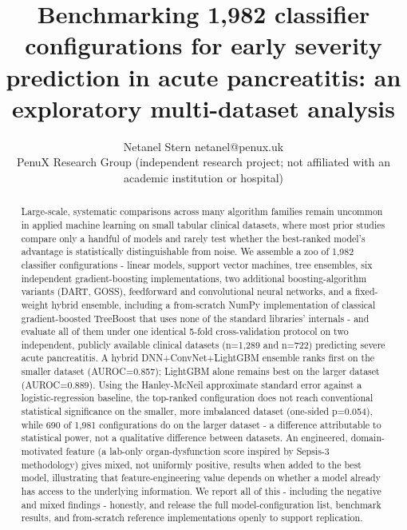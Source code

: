 \documentclass[twoside,11pt]{article}
\begin{document}
\title{Benchmarking 1,982 classifier configurations for early severity prediction in acute pancreatitis: an exploratory multi-dataset analysis}

\author{\name Netanel Stern \email netanel@penux.uk \\
       \addr PenuX Research Group (independent research project; not affiliated with an academic institution or hospital)}


\maketitle

\begin{abstract}
Large-scale, systematic comparisons across many algorithm families remain uncommon in applied machine learning on small tabular clinical datasets, where most prior studies compare only a handful of models and rarely test whether the best-ranked model's advantage is statistically distinguishable from noise. We assemble a zoo of 1,982 classifier configurations - linear models, support vector machines, tree ensembles, six independent gradient-boosting implementations, two additional boosting-algorithm variants (DART, GOSS), feedforward and convolutional neural networks, and a fixed-weight hybrid ensemble, including a from-scratch NumPy implementation of classical gradient-boosted TreeBoost that uses none of the standard libraries' internals - and evaluate all of them under one identical 5-fold cross-validation protocol on two independent, publicly available clinical datasets (n=1,289 and n=722) predicting severe acute pancreatitis. A hybrid DNN+ConvNet+LightGBM ensemble ranks first on the smaller dataset (AUROC=0.857); LightGBM alone remains best on the larger dataset (AUROC=0.889). Using the Hanley-McNeil approximate standard error against a logistic-regression baseline, the top-ranked configuration does not reach conventional statistical significance on the smaller, more imbalanced dataset (one-sided p=0.054), while 690 of 1,981 configurations do on the larger dataset - a difference attributable to statistical power, not a qualitative difference between datasets. An engineered, domain-motivated feature (a lab-only organ-dysfunction score inspired by Sepsis-3 methodology) gives mixed, not uniformly positive, results when added to the best model, illustrating that feature-engineering value depends on whether a model already has access to the underlying information. We report all of this - including the negative and mixed findings - honestly, and release the full model-configuration list, benchmark results, and from-scratch reference implementations openly to support replication.
\end{abstract}
\end{document}
